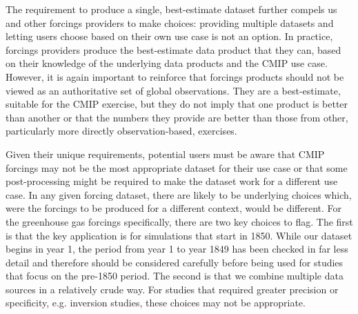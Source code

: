 The requirement to produce a single, best-estimate dataset further compels us and other forcings providers to make choices:
providing multiple datasets and letting users choose based on their own use case is not an option.
In practice, forcings providers produce the best-estimate data product that they can,
based on their knowledge of the underlying data products and the CMIP use case.
However, it is again important to reinforce that forcings products
should not be viewed as an authoritative set of global observations.
They are a best-estimate, suitable for the CMIP exercise,
but they do not imply that one product is better than another
or that the numbers they provide are better
than those from other, particularly more directly observation-based, exercises.

Given their unique requirements, potential users must be aware
that CMIP forcings may not be the most appropriate dataset for their use case
or that some post-processing might be required to make the dataset work for a different use case.
In any given forcing dataset, there are likely to be underlying choices which,
were the forcings to be produced for a different context, would be different.
For the greenhouse gas forcings specifically, there are two key choices to flag.
The first is that the key application is for simulations that start in 1850.
While our dataset begins in year 1, the period from year 1 to year 1849 has been checked in far less detail
and therefore should be considered carefully before being used for studies that focus on the pre-1850 period.
The second is that we combine multiple data sources in a relatively crude way.
For studies that required greater precision or specificity, e.g. inversion studies,
these choices may not be appropriate.
